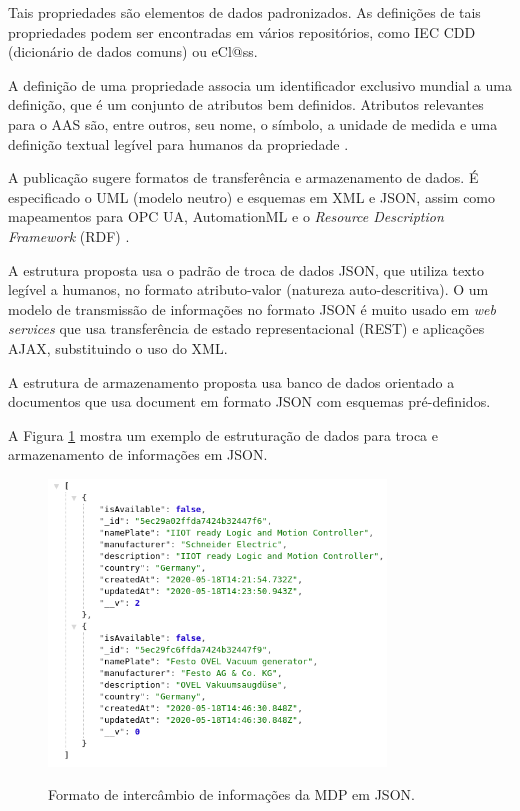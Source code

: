 \documentclass[
	12pt,				%
	oneside,			%
	a4paper,			%
	english,			%
	brazil				%
]{abntex2}
\begin{document}
	Tais propriedades são elementos de dados padronizados. As definições de tais propriedades podem ser encontradas em vários repositórios, como IEC CDD (dicionário de dados comuns) ou eCl@ss.
	
	A definição de uma propriedade associa um identificador exclusivo mundial a uma definição, que é um conjunto de atributos bem definidos. Atributos relevantes para o AAS são, entre outros, seu nome, o símbolo, a unidade de medida e uma definição textual legível para humanos da propriedade \cite{bader2019aas}.
	
	A publicação sugere formatos de transferência e armazenamento de dados. É especificado o UML (modelo neutro) e esquemas em XML e JSON, assim como mapeamentos para OPC UA, AutomationML e o \textit{Resource Description Framework} (RDF) \cite{germany2019detailsaas}.
	
	A estrutura proposta usa o padrão de troca de dados JSON, que utiliza texto legível a humanos, no formato atributo-valor (natureza auto-descritiva). O um modelo de transmissão de informações no formato JSON é muito usado em \textit{web services} que usa transferência de estado representacional (REST) e aplicações AJAX, substituindo o uso do XML.
	
	A estrutura de armazenamento proposta usa banco de dados orientado a documentos que usa document em formato JSON com esquemas pré-definidos.
	
	A Figura \ref{fig:json} mostra um exemplo de estruturação de dados para troca e armazenamento de informações em JSON.
	
	\begin{figure}[H]
		\centering
		\caption{Formato de intercâmbio de informações da MDP em JSON.}
		\includegraphics[width=0.8\textwidth]{json.png}
		\label{fig:json}
	\end{figure}
	
\end{document}
